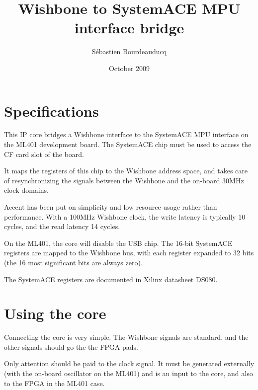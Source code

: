 \documentclass[a4paper,11pt]{article}
\title{Wishbone to SystemACE MPU interface bridge}
\author{S\'ebastien Bourdeauducq}
\date{October 2009}
\begin{document}
\setlength{\parindent}{0pt}
\setlength{\parskip}{5pt}
\maketitle{}
\section{Specifications}
This IP core bridges a Wishbone interface to the SystemACE MPU interface on the ML401 development board. The SystemACE chip must be used to access the CF card slot of the board.

It maps the registers of this chip to the Wishbone address space, and takes care of resynchronizing the signals between the Wishbone and the on-board 30MHz clock domains.

Accent has been put on simplicity and low resource usage rather than performance. With a 100MHz Wishbone clock, the write latency is typically 10 cycles, and the read latency 14 cycles.

On the ML401, the core will disable the USB chip. The 16-bit SystemACE registers are mapped to the Wishbone bus, with each register expanded to 32 bits (the 16 most significant bits are always zero).

The SystemACE registers are documented in Xilinx datasheet DS080.

\section{Using the core}
Connecting the core is very simple. The Wishbone signals are standard, and the other signals should go the the FPGA pads.

Only attention should be paid to the clock signal. It must be generated externally (with the on-board oscillator on the ML401) and is an input to the core, and also to the FPGA in the ML401 case.
\end{document}
